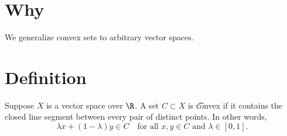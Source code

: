
\section*{Why}

We generalize convex sets to arbitrary vector spaces.

\section*{Definition}

Suppose $X$ is a vector space over $\R $.
A set $C \subset X$ is \t{convex} if it contains the closed line segment between every pair of distinct points.
In other words,
\[
\lambda x + (1-\lambda )y \in C \quad \text{for all } x, y \in C \text{ and } \lambda  \in [0,1].
\]

\blankpage